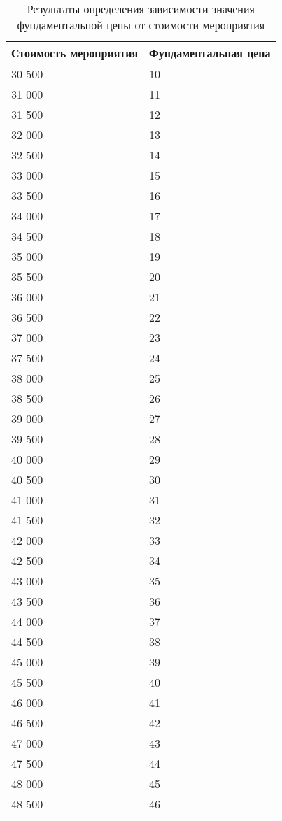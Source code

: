 \begin{table}[H]
	\centering
	\caption{Результаты определения зависимости значения фундаментальной цены от стоимости мероприятия}
	\label{tbl:dependence-2}
	\begin{tabularx}{\textwidth}{|X|X|}
		\hline
		\textbf{Стоимость мероприятия} & \textbf{Фундаментальная цена} \\
		\hline
		30 500 & 10 \\ \hline
		31 000 & 11 \\ \hline
		31 500 & 12 \\ \hline
		32 000 & 13 \\ \hline
		32 500 & 14 \\ \hline
		33 000 & 15 \\ \hline
		33 500 & 16 \\ \hline
		34 000 & 17 \\ \hline
		34 500 & 18 \\ \hline
		35 000 & 19 \\ \hline
		35 500 & 20 \\ \hline
		36 000 & 21 \\ \hline
		36 500 & 22 \\ \hline
		37 000 & 23 \\ \hline
		37 500 & 24 \\ \hline
		38 000 & 25 \\ \hline
		38 500 & 26 \\ \hline
		39 000 & 27 \\ \hline
		39 500 & 28 \\ \hline
		40 000 & 29 \\ \hline
		40 500 & 30 \\ \hline
		41 000 & 31 \\ \hline
		41 500 & 32 \\ \hline
		42 000 & 33 \\ \hline
		42 500 & 34 \\ \hline
		43 000 & 35 \\ \hline
		43 500 & 36 \\ \hline
		44 000 & 37 \\ \hline
		44 500 & 38 \\ \hline
		45 000 & 39 \\ \hline
		45 500 & 40 \\ \hline
		46 000 & 41 \\ \hline
		46 500 & 42 \\ \hline
		47 000 & 43 \\ \hline
		47 500 & 44 \\ \hline
		48 000 & 45 \\ \hline
		48 500 & 46 \\ \hline
	\end{tabularx}
\end{table}

